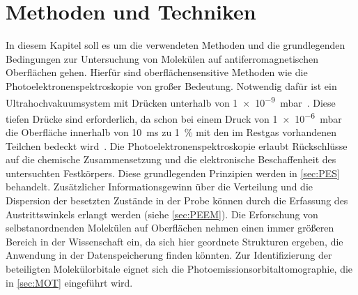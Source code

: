 \chapter{Methoden und Techniken} \label{cha:Methoden}
    In diesem Kapitel soll es um die verwendeten Methoden und die grundlegenden Bedingungen zur Untersuchung von Molekülen auf antiferromagnetischen Oberflächen gehen.
    Hierfür sind oberflächensensitive Methoden wie die Photoelektronenspektroskopie von großer Bedeutung.
    Notwendig dafür ist ein Ultrahochvakuumsystem mit Drücken unterhalb von \SI{1e-9}{\milli\bar}~\cite{Henzler}.
    Diese tiefen Drücke sind erforderlich, da schon bei einem Druck von \SI{1e-6}{\milli\bar} die Oberfläche innerhalb von \SI{10}{\milli\second} zu \SI{1}{\percent} mit den im Restgas vorhandenen Teilchen bedeckt wird~\cite{Henzler}.
    Die Photoelektronenspektroskopie erlaubt Rückschlüsse auf die chemische Zusammensetzung und die elektronische Beschaffenheit des untersuchten Festkörpers.
    Diese grundlegenden Prinzipien werden in \autoref{sec:PES} behandelt.
    Zusätzlicher Informationsgewinn über die Verteilung und die Dispersion der besetzten Zustände in der Probe können durch die Erfassung des Austrittswinkels erlangt werden (siehe \autoref{sec:PEEM}).
    Die Erforschung von selbstanordnenden Molekülen auf Oberflächen nehmen einen immer größeren Bereich in der Wissenschaft ein, da sich hier geordnete Strukturen ergeben, die Anwendung in der Datenspeicherung finden könnten.
    Zur Identifizierung der beteiligten Molekülorbitale eignet sich die Photoemissionsorbitaltomographie, die in \autoref{sec:MOT} eingeführt wird.

